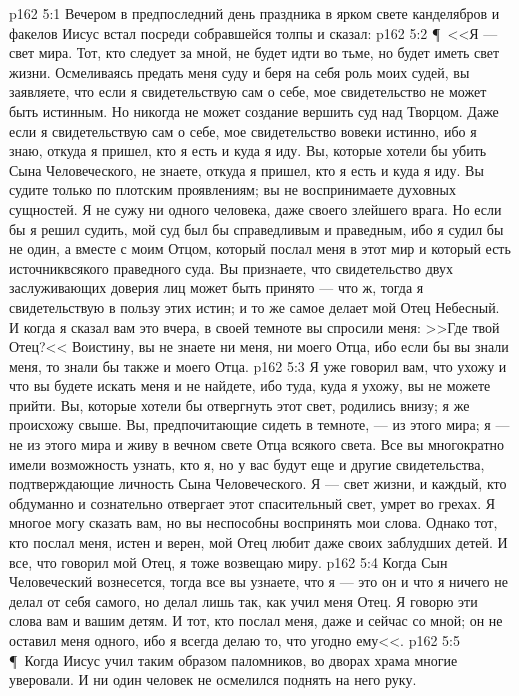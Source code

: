 \vs p162 5:1 Вечером в предпоследний день праздника в ярком свете канделябров и факелов Иисус встал посреди собравшейся толпы и сказал:
\vs p162 5:2 \P\ <<Я --- свет мира. Тот, кто следует за мной, не будет идти во тьме, но будет иметь свет жизни. Осмеливаясь предать меня суду и беря на себя роль моих судей, вы заявляете, что если я свидетельствую сам о себе, мое свидетельство не может быть истинным. Но никогда не может создание вершить суд над Творцом. Даже если я свидетельствую сам о себе, мое свидетельство вовеки истинно, ибо я знаю, откуда я пришел, кто я есть и куда я иду. Вы, которые хотели бы убить Сына Человеческого, не знаете, откуда я пришел, кто я есть и куда я иду. Вы судите только по плотским проявлениям; вы не воспринимаете духовных сущностей. Я не сужу ни одного человека, даже своего злейшего врага. Но если бы я решил судить, мой суд был бы справедливым и праведным, ибо я судил бы не один, а вместе с моим Отцом, который послал меня в этот мир и который есть источниквсякого праведного суда. Вы признаете, что свидетельство двух заслуживающих доверия лиц может быть принято --- что ж, тогда я свидетельствую в пользу этих истин; и то же самое делает мой Отец Небесный. И когда я сказал вам это вчера, в своей темноте вы спросили меня: >>Где твой Отец?<< Воистину, вы не знаете ни меня, ни моего Отца, ибо если бы вы знали меня, то знали бы также и моего Отца.
\vs p162 5:3 Я уже говорил вам, что ухожу и что вы будете искать меня и не найдете, ибо туда, куда я ухожу, вы не можете прийти. Вы, которые хотели бы отвергнуть этот свет, родились внизу; я же происхожу свыше. Вы, предпочитающие сидеть в темноте, --- из этого мира; я --- не из этого мира и живу в вечном свете Отца всякого света. Все вы многократно имели возможность узнать, кто я, но у вас будут еще и другие свидетельства, подтверждающие личность Сына Человеческого. Я --- свет жизни, и каждый, кто обдуманно и сознательно отвергает этот спасительный свет, умрет во грехах. Я многое могу сказать вам, но вы неспособны воспринять мои слова. Однако тот, кто послал меня, истен и верен, мой Отец любит даже своих заблудших детей. И все, что говорил мой Отец, я тоже возвещаю миру.
\vs p162 5:4 Когда Сын Человеческий вознесется, тогда все вы узнаете, что я --- это он и что я ничего не делал от себя самого, но делал лишь так, как учил меня Отец. Я говорю эти слова вам и вашим детям. И тот, кто послал меня, даже и сейчас со мной; он не оставил меня одного, ибо я всегда делаю то, что угодно ему<<.
\vs p162 5:5 \P\ Когда Иисус учил таким образом паломников, во дворах храма многие уверовали. И ни один человек не осмелился поднять на него руку.
